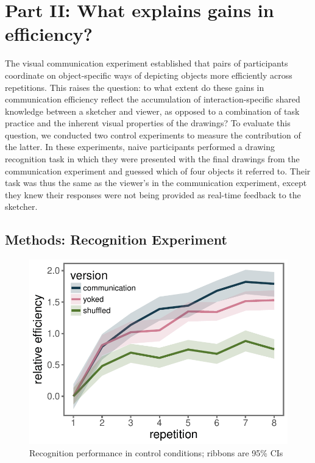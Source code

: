 \documentclass[10pt,letterpaper]{article}
\begin{document}

\section{Part II: What explains gains in efficiency?}

The visual communication experiment established that pairs of participants coordinate on object-specific ways of depicting objects more efficiently across repetitions.  
This raises the question: to what extent do these gains in communication efficiency reflect the accumulation of interaction-specific shared knowledge between a sketcher and viewer, as opposed to a combination of task practice and the inherent visual properties of the drawings? 
To evaluate this question, we conducted two control experiments to measure the contribution of the latter. 
In these experiments, naive participants performed a drawing recognition task in which they were presented with the final drawings from the communication experiment and guessed which of four objects it referred to. 
Their task was thus the same as the viewer's in the communication experiment, except they knew their responses were not being provided as real-time feedback to the sketcher.


\subsection{Methods: Recognition Experiment}


\begin{figure}
\includegraphics[width=\linewidth]{figures/recog_BIS_timeseries.pdf}
\caption{Recognition performance in control conditions; ribbons are 95\% CIs} 
\label{recog_bis}
\end{figure}
\end{document}
